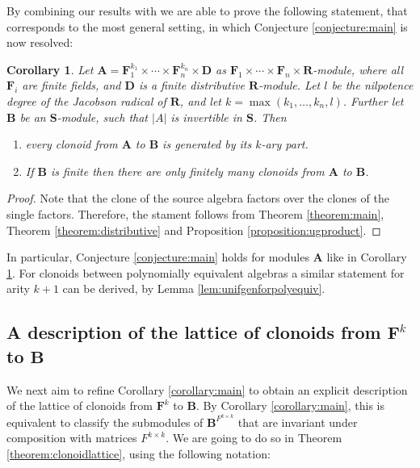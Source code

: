 \documentclass[11pt]{amsart}
\theoremstyle{plain}
\newtheorem{corollary}[thm]{Corollary}
\theoremstyle{definition}
\newcommand{\F}{{\mathbf F}}
\newcommand{\alg}[1]{\mathbf{#1}}
\newcommand{\algA}{\alg{A}}
\newcommand{\algB}{\alg{B}}
\newcommand{\algR}{\alg{R}}
\newcommand{\algS}{\alg{S}}
\begin{document}
By combining our results with \cite{MW-clonoidsmodules} we are able to prove the following statement, that corresponds to the most general setting, in which Conjecture \ref{conjecture:main} is now resolved:

\begin{corollary} \label{corollary:mainresultproducts}
Let $\algA =\F_1^{k_1}\times \cdots \times \F_n^{k_n} \times \alg D$ as $\F_1\times \cdots \times\F_n \times \algR$-module, where all $\F_i$ are finite fields, and $\alg D$ is a finite distributive $\algR$-module. Let $l$ be the nilpotence degree of the Jacobson radical of $\algR$, and let $k = \max(k_1,\ldots,k_n,l)$. Further let $\algB$ be an $\algS$-module, such that $|A|$ is invertible in $\algS$. Then
\begin{enumerate}
\item every clonoid from $\alg A$ to $\algB$ is generated by its $k$-ary part.
\item If $\algB$ is finite then there are only finitely many clonoids from $\algA$ to $\algB$.
\end{enumerate}
\end{corollary}

\begin{proof}
Note that the clone of the source algebra factors over the clones of the single factors. Therefore, the stament follows from Theorem \ref{theorem:main}, Theorem \ref{theorem:distributive} and Proposition \ref{proposition:ugproduct}.
\end{proof}

In particular, Conjecture \ref{conjecture:main} holds for modules $\algA$ like in Corollary \ref{corollary:mainresultproducts}. For clonoids between polynomially equivalent algebras a similar statement for arity $k+1$ can be derived, by Lemma \ref{lem:unifgenforpolyequiv}.


\subsection{A description of the lattice of clonoids from $\F^k$ to $\algB$} \label{sect:clonoidlattice}

We next aim to refine Corollary \ref{corollary:main} to obtain an explicit description of the lattice of clonoids from $\F^k$ to $\algB$. By Corollary \ref{corollary:main}, this is equivalent to classify the submodules of $\algB^{F^{k \times k}}$ that are invariant under composition with matrices $F^{k\times k}$. We are going to do so in Theorem \ref{theorem:clonoidlattice}, using the following notation:
\end{document}
